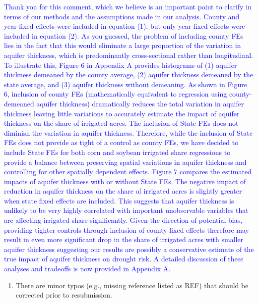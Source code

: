 \documentclass[
]{article}
\providecommand{\tightlist}{%
  \setlength{\itemsep}{0pt}\setlength{\parskip}{0pt}}
\begin{document}
\textcolor{blue}{Thank you for this comment, which we believe is an important point to clarify in terms of our methods and the assumptions made in our analysis. County and year fixed effects were included in equation (1), but only year fixed effects were included in equation (2). As you guessed, the problem of including county FEs lies in the fact that this would eliminate a large proportion of the variation in aquifer thickness, which is predominantly cross-sectional rather than longitudinal. To illustrate this, Figure 6 in Appendix A provides histograms of (1) aquifer thickness demeaned by the county average, (2) aquifer thickness demeaned by the state average, and (3) aquifer thickness without demeaning. As shown in Figure 6, inclusion of county FEs (mathematically equivalent to regression using county-demeaned aquifer thickness) dramatically reduces the total variation in aquifer thickness leaving little variations to accurately estimate the impact of aquifer thickness on the share of irrigated acres. The inclusion of State FEs does not diminish the variation in aquifer thickness. Therefore, while the inclusion of State FEs does not provide as tight of a control as county FEs, we have decided to include State FEs for both corn and soybean irrigated share regressions to provide a balance between preserving spatial variations in aquifer thickness and controlling for other spatially dependent effects. Figure 7 compares the estimated impacts of aquifer thickness with or without State FEs. The negative impact of reduction in aquifer thickness on the share of irrigated acres is slightly greater when state fixed effects are included. This suggests that aquifer thickness is unlikely to be very highly correlated with important unobservable variables that are affecting irrigated share significantly. Given the direction of potential bias, providing tighter controls through inclusion of county fixed effects therefore may result in even more significant drop in the share of irrigated acres with smaller aquifer thickness suggesting our results are possibly a conservative estimate of the true impact of aquifer thickness on drought risk. A detailed discussion of these analyses and tradeoffs is now provided in Appendix A.
}

\begin{enumerate}
\def\labelenumi{\arabic{enumi}.}
\setcounter{enumi}{3}
\tightlist
\item
  There are minor typos (e.g., missing reference listed as REF) that
  should be corrected prior to resubmission.
\end{enumerate}
\end{document}
